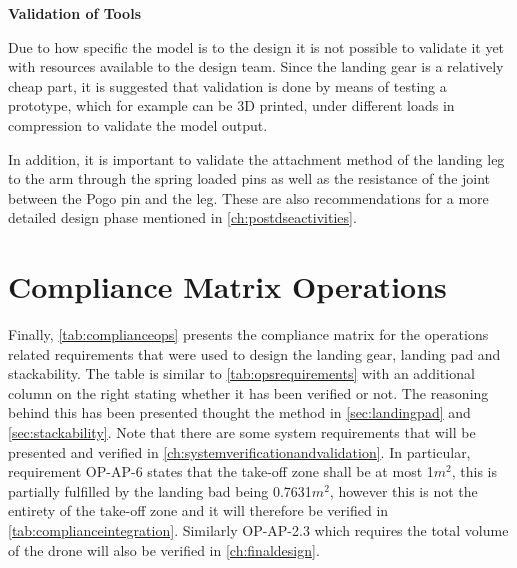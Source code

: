 \textbf{Validation of Tools}

Due to how specific the model is to the design it is not possible to validate it yet with resources available to the design team. Since the landing gear is a relatively cheap part, it is suggested that validation is done by means of testing a prototype, which for example can be 3D printed, under different loads in compression to validate the model output.

In addition, it is important to validate the attachment method of the landing leg to the arm through the spring loaded pins as well as the resistance of the joint between the Pogo pin and the leg. These are also recommendations for a more detailed design phase mentioned in \autoref{ch:postdseactivities}.




\section{Compliance Matrix Operations} \label{sec:opscompliancematrix}

Finally, \autoref{tab:complianceops} presents the compliance matrix for the operations related requirements that were used to design the landing gear, landing pad and stackability. The table is similar to \autoref{tab:opsrequirements} with an additional column on the right stating whether it has been verified or not. The reasoning behind this has been presented thought the method in 
\autoref{sec:landingpad} and \autoref{sec:stackability}. Note that there are some system requirements that will be presented and verified in \autoref{ch:systemverificationandvalidation}. In particular, requirement OP-AP-6 states that the take-off zone shall be at most 1$m^2$, this is partially fulfilled by the landing bad being 0.7631$m^2$, however this is not the entirety of the take-off zone and it will therefore be verified in \autoref{tab:complianceintegration}. Similarly OP-AP-2.3 which requires the total volume of the drone will also be verified in \autoref{ch:finaldesign}.

